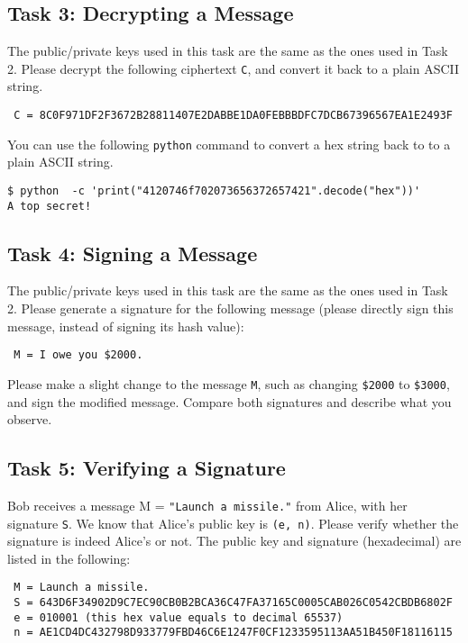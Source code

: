 \subsection{Task 3: Decrypting a Message}

The public/private keys used in this task are the same as the ones used in Task 2. 
Please decrypt the following ciphertext \texttt{C}, and convert it back to 
a plain ASCII string.

\begin{lstlisting}
 C = 8C0F971DF2F3672B28811407E2DABBE1DA0FEBBBDFC7DCB67396567EA1E2493F
\end{lstlisting}


You can use the following \texttt{python} command to convert 
a hex string back to to a plain ASCII string. 
\begin{lstlisting}
$ python  -c 'print("4120746f702073656372657421".decode("hex"))'
A top secret!
\end{lstlisting}

 

\subsection{Task 4: Signing a Message}

The public/private keys used in this task are the same as the ones used in Task 2.
Please generate a signature for the following message (please directly sign this message,
instead of signing its hash value): 

\begin{lstlisting}
 M = I owe you $2000.
\end{lstlisting}

Please make a slight change to the message \texttt{M}, such as changing \texttt{\$2000}
to \texttt{\$3000}, and sign the modified message. Compare both signatures and describe what
you observe. 
 

\subsection{Task 5: Verifying a Signature}

Bob receives a message M = \texttt{"Launch a missile."} from
Alice, with her signature \texttt{S}. We know that Alice's public key is \texttt{(e, n)}.
Please verify whether the signature is indeed Alice's or not. 
The public key and signature (hexadecimal) are listed in the following:

\begin{lstlisting}
 M = Launch a missile.
 S = 643D6F34902D9C7EC90CB0B2BCA36C47FA37165C0005CAB026C0542CBDB6802F
 e = 010001 (this hex value equals to decimal 65537)
 n = AE1CD4DC432798D933779FBD46C6E1247F0CF1233595113AA51B450F18116115 
\end{lstlisting}


